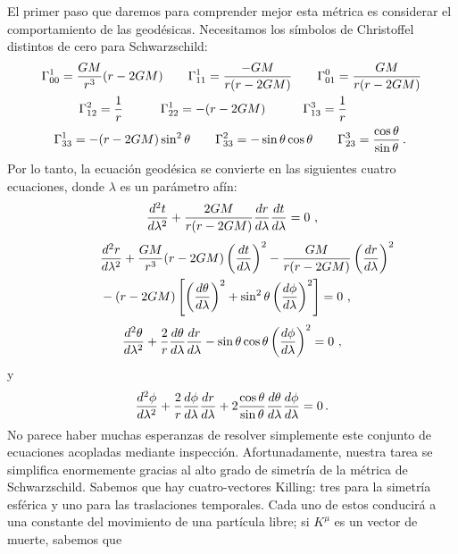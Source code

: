\documentclass[11pt,b5paper,openany,twoside]{book}
\begin{document}
El primer paso que daremos para comprender mejor esta métrica es considerar el comportamiento de las geodésicas.
Necesitamos los símbolos de Christoffel distintos de cero para Schwarzschild:
\begin{align}
&\Gamma^1_{00} = {{GM}\over {r^3}}(r-2GM)\qquad
\Gamma^1_{11} = {{-GM}\over{r(r-2GM)}} \qquad
\Gamma^0_{01} = {{GM}\over{r(r-2GM)}}  \notag \\
&\quad\qquad\Gamma^2_{12} = {1\over r}\qquad\quad
\Gamma^1_{22} = - (r-2GM)\qquad\quad
\Gamma^3_{13} = {1\over r} \notag \\
&\quad\Gamma^1_{33} = -(r-2GM)\sin^2\theta\qquad
\Gamma^2_{33} = -\sin\theta \cos\theta \qquad
\Gamma^3_{23} = {{\cos\theta}\over {\sin\theta}}\,.\label{7.33}
\end{align}
Por lo tanto, la ecuación geodésica se convierte en las siguientes cuatro ecuaciones, donde $\lambda$ es un parámetro afín:
\begin{equation}
{{d^2 t}\over{d\lambda^2}} + {{2GM}\over{r(r-2GM)}}
{{dr}\over{d\lambda}}{{dt}\over{d\lambda}} =0\ ,\label{7.34}
\end{equation}
\begin{align}
\lefteqn{{{d^2 r}\over{d\lambda^2}} + {{GM}\over {r^3}}(r-2GM)
\left({{dt}\over{d\lambda}}\right)^2 - {{GM}\over{r(r-2GM)}}
\left({{dr}\over{d\lambda}}\right)^2}  \notag \\
& -(r-2GM)\left[
\left({{d\theta}\over{d\lambda}}\right)^2+\sin^2\theta
\left({{d\phi}\over{d\lambda}}\right)^2\right] = 0 \ ,\label{7.35}
\end{align}
\begin{equation}
{{d^2 \theta}\over{d\lambda^2}} + {2\over r}{{d\theta}\over{d\lambda}}
{{dr}\over{d\lambda}} - \sin\theta \cos\theta
\left({{d\phi}\over{d\lambda}}\right)^2 = 0\ ,\label{7.36}
\end{equation}
y
\begin{equation}
{{d^2 \phi}\over{d\lambda^2}} + {2\over r}{{d\phi}\over{d\lambda}}
{{dr}\over{d\lambda}} + 2{{\cos\theta}\over {\sin\theta}}
{{d\theta}\over{d\lambda}}{{d\phi}\over{d\lambda}} = 0\,.\label{7.37}
\end{equation}
No parece haber muchas esperanzas de resolver simplemente este conjunto de ecuaciones acopladas mediante inspección.
Afortunadamente, nuestra tarea se simplifica enormemente gracias al alto grado de simetría de la métrica de Schwarzschild.
Sabemos que hay cuatro-vectores Killing: tres para la simetría esférica y uno para las traslaciones temporales.
Cada uno de estos conducirá a una constante del movimiento de una partícula libre; si $K^\mu$ es un vector de muerte, sabemos que
\end{document}
